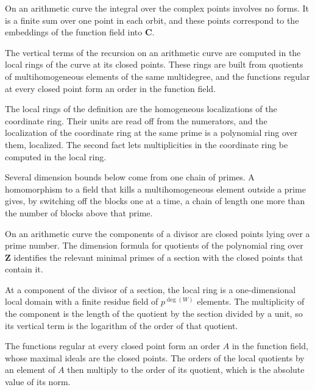 On an arithmetic curve the integral over the complex points involves no forms. It is a finite sum over one point in
each orbit, and these points correspond to the embeddings of the function field into $\mathbf C$.

The vertical terms of the recursion on an arithmetic curve are computed in the local rings of the curve at its closed
points. These rings are built from quotients of multihomogeneous elements of the same multidegree, and the functions
regular at every closed point form an order in the function field.

The local rings of the definition are the homogeneous localizations of the coordinate ring. Their units are read off from
the numerators, and the localization of the coordinate ring at the same prime is a polynomial ring over them, localized.
The second fact lets multiplicities in the coordinate ring be computed in the local ring.

Several dimension bounds below come from one chain of primes. A homomorphism to a field that kills a multihomogeneous
element outside a prime gives, by switching off the blocks one at a time, a chain of length one more than the number of
blocks above that prime.

On an arithmetic curve the components of a divisor are closed points lying over a prime number. The dimension formula for
quotients of the polynomial ring over $\mathbf Z$ identifies the relevant minimal primes of a section with the closed points
that contain it.

At a component of the divisor of a section, the local ring is a one-dimensional local domain with a finite residue field
of $p^{\deg(W)}$ elements. The multiplicity of the component is the length of the quotient by the section divided by a
unit, so its vertical term is the logarithm of the order of that quotient.

The functions regular at every closed point form an order $A$ in the function field, whose maximal ideals are the closed
points. The orders of the local quotients by an element of $A$ then multiply to the order of its quotient, which is the
absolute value of its norm.

